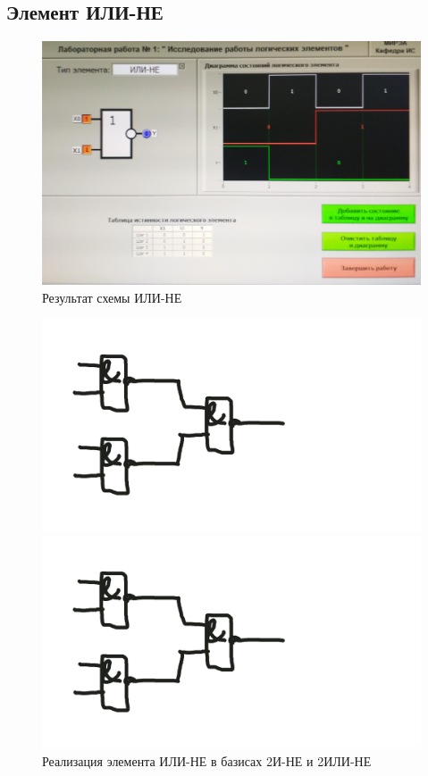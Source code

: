 \subsection{Элемент ИЛИ-НЕ}

\begin{figure}[H]
	\centering
	\includegraphics[width=0.85\linewidth]{imgs/1/or-not}
	\caption{Результат схемы ИЛИ-НЕ}
	\label{fig:1_or-not}
\end{figure}

\begin{figure}[H]
	\centering
	\begin{minipage}{.45\textwidth}
		\centering
		\includegraphics[width=0.85\linewidth]{imgs/1/or-not_and}
	\end{minipage}
	\begin{minipage}{.45\textwidth}
		\centering
		\includegraphics[width=0.85\linewidth]{imgs/1/or-not_or}
	\end{minipage}
	\caption{Реализация элемента ИЛИ-НЕ в базисах 2И-НЕ и 2ИЛИ-НЕ}
\end{figure}

